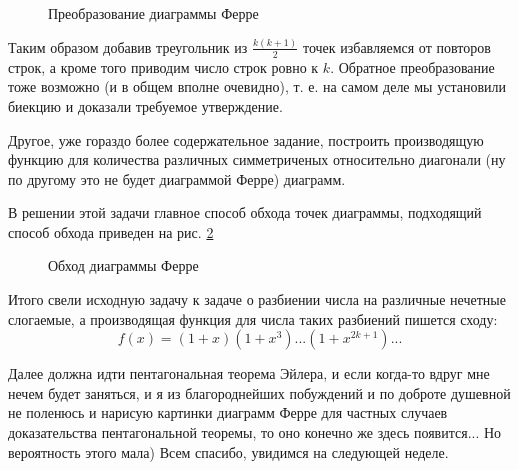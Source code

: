 \begin{figure}[h]
\caption{Преобразование диаграммы Ферре}
\label{img::ferre1}
\end{figure}

Таким образом добавив треугольник из $\frac{k \left(k+1\right)}{2}$ точек избавляемся от повторов строк, а кроме того приводим число строк ровно к $k$.
Обратное преобразование тоже возможно (и в общем вполне очевидно), т. е. на самом деле мы установили биекцию и доказали требуемое утверждение.

Другое, уже гораздо более содержательное задание, построить производящую функцию для количества различных симметриченых относительно диагонали (ну по другому это не будет диаграммой Ферре) диаграмм.

В решении этой задачи главное способ обхода точек диаграммы, подходящий способ обхода приведен на рис. \ref{img::ferre2}

\begin{figure}[h]
\caption{Обход диаграммы Ферре}
\label{img::ferre2}
\end{figure}

Итого свели исходную задачу к задаче о разбиении числа на различные нечетные слогаемые, а производящая функция для числа таких разбиений пишется сходу:
\[
	f\left(x\right) = \left(1+x\right)\left(1+x^3\right)...\left(1+x^{2k+1}\right)...
\]

Далее должна идти пентагональная теорема Эйлера, и если когда-то вдруг мне нечем будет заняться, и я из благороднейших побуждений и по доброте душевной не поленюсь и нарисую картинки диаграмм Ферре для частных случаев доказательства пентагональной теоремы, то оно конечно же здесь появится... Но вероятность этого мала) Всем спасибо, увидимся на следующей неделе.
